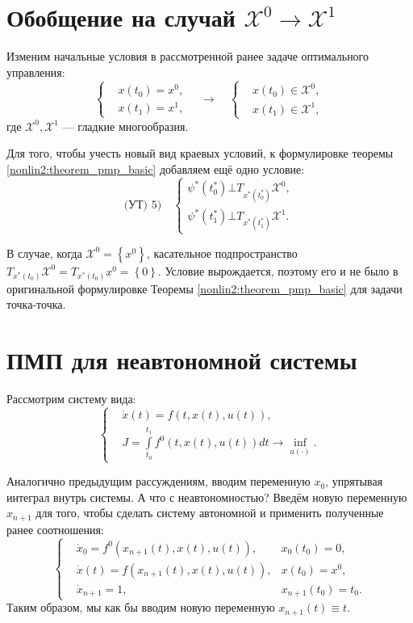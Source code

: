 \section*{Обобщение на случай $\mathscr{X}^0 \to \mathscr{X}^1$}

Изменим начальные условия в рассмотренной ранее задаче оптимального управления:
$$
\left\{
    \begin{aligned}
        & x(t_0) = x^0, \\
        & x(t_1) = x^1,
    \end{aligned}
\right.
\quad \rightarrow \quad
\left\{
    \begin{aligned}
        & x(t_0) \in \mathscr{X}^0, \\
        & x(t_1) \in \mathscr{X}^1,
    \end{aligned}
\right.
$$
где $\mathscr{X}^0, \mathscr{X}^1$ --- гладкие многообразия.

Для того, чтобы учесть новый вид краевых условий, к формулировке теоремы \ref{nonlin2:theorem_pmp_basic} добавляем ещё одно условие:
$$
    \text{(УТ) 5)} \quad
    \left\{
    \begin{matrix}
        \psi^*(t_0^*) \bot T_{x^*(t_0^*)}\mathscr{X}^0, \\
        \psi^*(t_1^*) \bot T_{x^*(t_1^*)}\mathscr{X}^1.
    \end{matrix}
    \right.
$$

\begin{remark}
    В случае, когда $\mathscr{X}^0 = \left\{ x^0 \right\}$, касательное подпространство $T_{x^*(t_0)}\mathscr{X}^0 = T_{x^*(t_0)}x^0 = \left\{ 0 \right\}$. Условие вырождается, поэтому его и не было в оригинальной формулировке Теоремы \ref{nonlin2:theorem_pmp_basic} для задачи точка-точка.
\end{remark}

\section*{ПМП для неавтономной системы}
Рассмотрим систему вида:
$$
\left\{
    \begin{aligned}
        & \dot{x}(t) = f(t, x(t), u(t)), \\
        & J = \int\limits_{t_0}^{t_1} f^0(t, x(t), u(t)) dt \to \inf\limits_{u(\cdot)}.
    \end{aligned}
\right.
$$

Аналогично предыдущим рассуждениям, вводим переменную $x_0$, упрятывая интеграл внутрь системы. А что с неавтономностью? Введём новую переменную $x_{n+1}$ для того, чтобы сделать систему автономной и применить полученные ранее соотношения:
$$
\left\{
    \begin{aligned}
        & \dot{x}_0 = f^0(x_{n+1}(t), x(t), u(t)), & x_0(t_0) = 0, \\
        & \dot{x}(t) = f(x_{n+1}(t), x(t), u(t)), & x(t_0) = x^0, \\
        & \dot{x}_{n+1} = 1, & x_{n+1}(t_0) = t_0.
    \end{aligned}
\right.
$$
Таким образом, мы как бы вводим новую переменную $x_{n+1}(t) \equiv t$.

